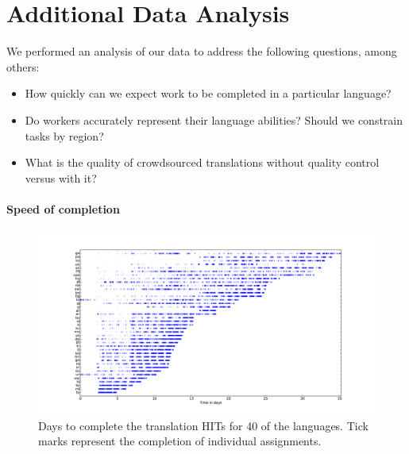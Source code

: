 \documentclass[11pt]{article}
\begin{document}
\section{Additional Data Analysis}

We performed an analysis of our data to address the following questions, among others:
\begin{itemize}
\item How quickly can we expect work to be completed in a particular language? 
\item Do workers accurately represent their language abilities?  Should we constrain tasks by region? 
\item What is the quality of crowdsourced translations without quality control versus with it? 

\end{itemize}


\paragraph{Speed of completion}

\begin{figure}[h]
\includegraphics[height=\linewidth,angle=270]{final-figures/completetime}
\caption{Days to complete the translation HITs for 40 of the languages. Tick marks represent the completion of individual assignments. }
\label{completion-time}
\end{figure}
\end{document}
